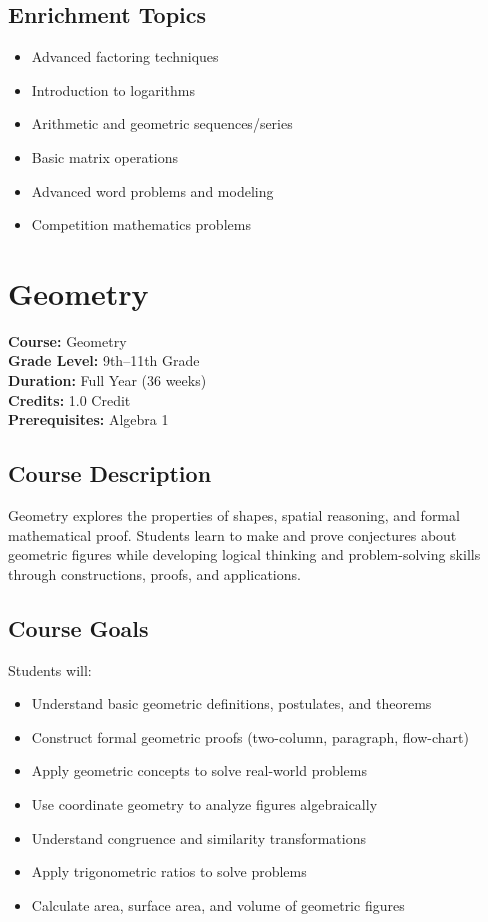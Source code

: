 \documentclass[12pt,oneside]{book}
\begin{document}
\section{Enrichment Topics}
\begin{itemize}[leftmargin=2em]
    \item Advanced factoring techniques
    \item Introduction to logarithms
    \item Arithmetic and geometric sequences/series
    \item Basic matrix operations
    \item Advanced word problems and modeling
    \item Competition mathematics problems
\end{itemize}

\chapter{Geometry}

\noindent\textbf{Course:} Geometry\\
\textbf{Grade Level:} 9th--11th Grade\\
\textbf{Duration:} Full Year (36 weeks)\\
\textbf{Credits:} 1.0 Credit\\
\textbf{Prerequisites:} Algebra 1

\section{Course Description}
Geometry explores the properties of shapes, spatial reasoning, and formal mathematical proof.
Students learn to make and prove conjectures about geometric figures while developing logical
thinking and problem-solving skills through constructions, proofs, and applications.

\section{Course Goals}
Students will:
\begin{itemize}[leftmargin=2em]
    \item Understand basic geometric definitions, postulates, and theorems
    \item Construct formal geometric proofs (two-column, paragraph, flow-chart)
    \item Apply geometric concepts to solve real-world problems
    \item Use coordinate geometry to analyze figures algebraically
    \item Understand congruence and similarity transformations
    \item Apply trigonometric ratios to solve problems
    \item Calculate area, surface area, and volume of geometric figures
\end{itemize}
\end{document}
